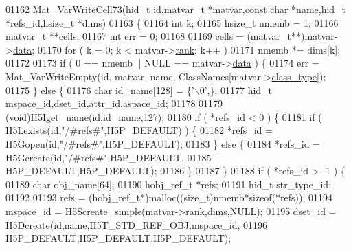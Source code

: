 \begin{DoxyCode}
01162 Mat\_VarWriteCell73(hid\_t \textcolor{keywordtype}{id},\hyperlink{group___m_a_t_structmatvar__t}{matvar\_t} *matvar,\textcolor{keyword}{const} \textcolor{keywordtype}{char} *name,hid\_t *refs\_id,hsize\_t *dims)
01163 \{
01164     \textcolor{keywordtype}{int}        k;
01165     hsize\_t    nmemb = 1;
01166     \hyperlink{group___m_a_t_structmatvar__t}{matvar\_t} **cells;
01167     \textcolor{keywordtype}{int}        err = 0;
01168 
01169     cells = (\hyperlink{group___m_a_t_structmatvar__t}{matvar\_t}**)matvar->\hyperlink{group___m_a_t_a5672978efa230bbdecdf38ede781f7fa}{data};
01170     for ( k = 0; k < matvar->\hyperlink{group___m_a_t_a84ba70c96ded13cc555fa75b768d9921}{rank}; k++ )
01171         nmemb *= dims[k];
01172 
01173     \textcolor{keywordflow}{if} ( 0 == nmemb || NULL == matvar->\hyperlink{group___m_a_t_a5672978efa230bbdecdf38ede781f7fa}{data} ) \{
01174         err = Mat\_VarWriteEmpty(\textcolor{keywordtype}{id}, matvar, name, ClassNames[matvar->\hyperlink{group___m_a_t_aff13035bf3265dd7d9425e5d40c839d4}{class\_type}]);
01175     \} \textcolor{keywordflow}{else} \{
01176         \textcolor{keywordtype}{char}  id\_name[128] = \{\textcolor{charliteral}{'\(\backslash\)0'},\};
01177         hid\_t mspace\_id,dset\_id,attr\_id,aspace\_id;
01178 
01179         (void)H5Iget\_name(\textcolor{keywordtype}{id},id\_name,127);
01180         \textcolor{keywordflow}{if} ( *refs\_id < 0 ) \{
01181             \textcolor{keywordflow}{if} ( H5Lexists(\textcolor{keywordtype}{id},\textcolor{stringliteral}{"/#refs#"},H5P\_DEFAULT) ) \{
01182                 *refs\_id = H5Gopen(\textcolor{keywordtype}{id},\textcolor{stringliteral}{"/#refs#"},H5P\_DEFAULT);
01183             \} \textcolor{keywordflow}{else} \{
01184                 *refs\_id = H5Gcreate(\textcolor{keywordtype}{id},\textcolor{stringliteral}{"/#refs#"},H5P\_DEFAULT,
01185                                      H5P\_DEFAULT,H5P\_DEFAULT);
01186             \}
01187         \}
01188         \textcolor{keywordflow}{if} ( *refs\_id > -1 ) \{
01189             \textcolor{keywordtype}{char}        obj\_name[64];
01190             hobj\_ref\_t *refs;
01191             hid\_t       str\_type\_id;
01192 
01193             refs = (hobj\_ref\_t*)malloc((\textcolor{keywordtype}{size\_t})nmemb*\textcolor{keyword}{sizeof}(*refs));
01194             mspace\_id = H5Screate\_simple(matvar->\hyperlink{group___m_a_t_a84ba70c96ded13cc555fa75b768d9921}{rank},dims,NULL);
01195             dset\_id = H5Dcreate(\textcolor{keywordtype}{id},name,H5T\_STD\_REF\_OBJ,mspace\_id,
01196                                 H5P\_DEFAULT,H5P\_DEFAULT,H5P\_DEFAULT);

\end{DoxyCode}
